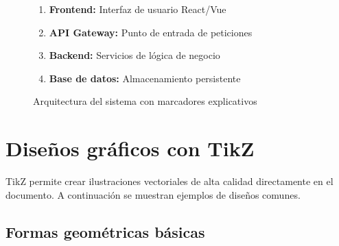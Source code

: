 \begin{figure}[H]
  \centering

  \vspace{0.5em}
  \begin{enumerate}
    \item \textbf{Frontend:} Interfaz de usuario React/Vue
    \item \textbf{API Gateway:} Punto de entrada de peticiones
    \item \textbf{Backend:} Servicios de lógica de negocio
    \item \textbf{Base de datos:} Almacenamiento persistente
  \end{enumerate}
  \caption{Arquitectura del sistema con marcadores explicativos}
  \label{fig:arquitectura-numerada}
\end{figure}

\section{Diseños gráficos con TikZ}
\label{sec:disenos-tikz}

TikZ permite crear ilustraciones vectoriales de alta calidad directamente en el documento. A continuación se muestran ejemplos de diseños comunes.

\subsection{Formas geométricas básicas}
\label{subsec:formas-basicas}

